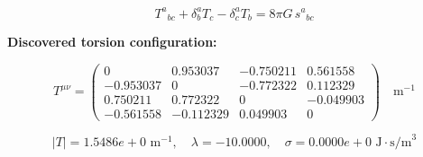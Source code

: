 
\begin{equation}
  T^a{}_{bc} + \delta^a_b T_c - \delta^a_c T_b = 8\pi G \, s^a{}_{bc}
\end{equation}

\textbf{Discovered torsion configuration:}

\begin{equation}
  T^{\mu\nu} = \begin{pmatrix}
    0 & 0.953037 & -0.750211 & 0.561558 \\
    -0.953037 & 0 & -0.772322 & 0.112329 \\
    0.750211 & 0.772322 & 0 & -0.049903 \\
    -0.561558 & -0.112329 & 0.049903 & 0
  \end{pmatrix} \quad \text{m}^{-1}
\end{equation}

\begin{equation}
  |T| = 1.5486e+0 \text{ m}^{-1}, \quad
  \lambda = -10.0000, \quad
  \sigma = 0.0000e+0 \text{ J}\cdot\text{s/m}^3
\end{equation}